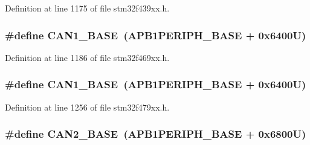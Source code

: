 Definition at line 1175 of file stm32f439xx.\+h.

\subsubsection[{\texorpdfstring{C\+A\+N1\+\_\+\+B\+A\+SE}{CAN1_BASE}}]{\setlength{\rightskip}{0pt plus 5cm}\#define C\+A\+N1\+\_\+\+B\+A\+SE~({\bf A\+P\+B1\+P\+E\+R\+I\+P\+H\+\_\+\+B\+A\+SE} + 0x6400\+U)}\hypertarget{group___peripheral__memory__map_gad8e45ea6c032d9fce1b0516fff9d8eaa}{}\label{group___peripheral__memory__map_gad8e45ea6c032d9fce1b0516fff9d8eaa}


Definition at line 1186 of file stm32f469xx.\+h.

\subsubsection[{\texorpdfstring{C\+A\+N1\+\_\+\+B\+A\+SE}{CAN1_BASE}}]{\setlength{\rightskip}{0pt plus 5cm}\#define C\+A\+N1\+\_\+\+B\+A\+SE~({\bf A\+P\+B1\+P\+E\+R\+I\+P\+H\+\_\+\+B\+A\+SE} + 0x6400\+U)}\hypertarget{group___peripheral__memory__map_gad8e45ea6c032d9fce1b0516fff9d8eaa}{}\label{group___peripheral__memory__map_gad8e45ea6c032d9fce1b0516fff9d8eaa}


Definition at line 1256 of file stm32f479xx.\+h.

\subsubsection[{\texorpdfstring{C\+A\+N2\+\_\+\+B\+A\+SE}{CAN2_BASE}}]{\setlength{\rightskip}{0pt plus 5cm}\#define C\+A\+N2\+\_\+\+B\+A\+SE~({\bf A\+P\+B1\+P\+E\+R\+I\+P\+H\+\_\+\+B\+A\+SE} + 0x6800\+U)}\hypertarget{group___peripheral__memory__map_gaf7b8267b0d439f8f3e82f86be4b9fba1}{}\label{group___peripheral__memory__map_gaf7b8267b0d439f8f3e82f86be4b9fba1}


